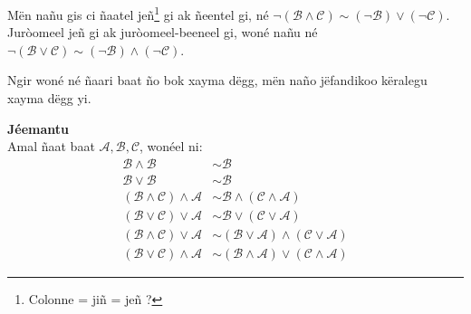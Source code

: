 \documentclass[twoside, a4paper]{article}
\begin{document}
Mën nañu gis ci ñaatel jeñ\footnote{Colonne = jiñ = jeñ ?} gi ak ñeentel gi, né $\neg(\mathcal{B} \land \mathcal{C}) \sim (\neg\mathcal{B}) \lor (\neg \mathcal{C})$. Juròomeel jeñ gi ak juròomeel-beeneel gi, woné nañu né $\neg(\mathcal{B} \lor \mathcal{C})\sim (\neg\mathcal{B}) \land (\neg \mathcal{C})$.


\begin{tcolorbox}[enhanced jigsaw,breakable,pad at break*=1mm, colback=green!5!white,colframe=white!75!black,title= Tègtal\footnote{Indication ?},
    watermark color=white]
  Ngir woné né ñaari baat ño bok xayma dëgg, mën naño jëfandikoo këralegu xayma dëgg yi.
\end{tcolorbox}

\textbf{Jéemantu}\\
Amal ñaat baat $\mathcal{A}, \mathcal{B}, \mathcal{C}$, wonéel ni:
\begin{align*}
  \mathcal{B} \land \mathcal{B}                     & \sim \mathcal{B}                                                          \\
  \mathcal{B} \lor \mathcal{B}                      & \sim \mathcal{B}                                                          \\
  (\mathcal{B} \land \mathcal{C}) \land \mathcal{A} & \sim \mathcal{B} \land (\mathcal{C} \land \mathcal{A})                    \\
  (\mathcal{B} \lor \mathcal{C}) \lor \mathcal{A}   & \sim \mathcal{B} \lor (\mathcal{C} \lor \mathcal{A})                      \\
  (\mathcal{B} \land \mathcal{C}) \lor \mathcal{A}  & \sim (\mathcal{B} \lor \mathcal{A}) \land (\mathcal{C} \lor \mathcal{A})  \\
  (\mathcal{B} \lor \mathcal{C}) \land \mathcal{A}  & \sim (\mathcal{B} \land \mathcal{A}) \lor (\mathcal{C} \land \mathcal{A})
\end{align*}
\end{document}
